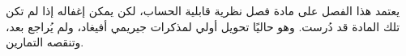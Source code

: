 \documentclass[../../../include/open-logic-chapter]{subfiles}
\begin{document}
\begin{editorial}
  يعتمد هذا الفصل على مادة فصل نظرية قابلية الحساب، لكن يمكن إغفاله
  إذا لم تكن تلك المادة قد دُرست. وهو حاليًا تحويل أولي لمذكرات
  جيريمي أفيغاد، ولم يُراجع بعد، وتنقصه التمارين.
\end{editorial}












\OLEndChapterHook
\end{document}
